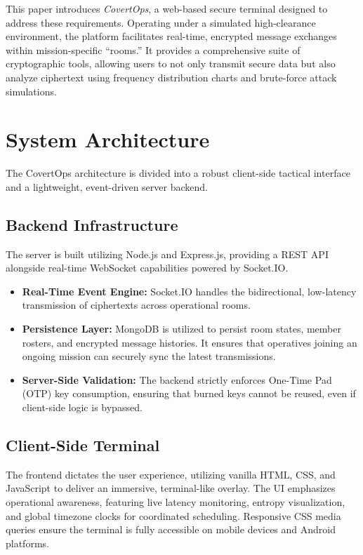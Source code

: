 \documentclass[conference]{IEEEtran}
\begin{document}
This paper introduces \textit{CovertOps}, a web-based secure terminal designed to address these requirements. Operating under a simulated high-clearance environment, the platform facilitates real-time, encrypted message exchanges within mission-specific ``rooms.'' It provides a comprehensive suite of cryptographic tools, allowing users to not only transmit secure data but also analyze ciphertext using frequency distribution charts and brute-force attack simulations.

\section{System Architecture}

The CovertOps architecture is divided into a robust client-side tactical interface and a lightweight, event-driven server backend.

\subsection{Backend Infrastructure}
The server is built utilizing Node.js and Express.js, providing a REST API alongside real-time WebSocket capabilities powered by Socket.IO. 
\begin{itemize}
    \item \textbf{Real-Time Event Engine:} Socket.IO handles the bidirectional, low-latency transmission of ciphertexts across operational rooms.
    \item \textbf{Persistence Layer:} MongoDB is utilized to persist room states, member rosters, and encrypted message histories. It ensures that operatives joining an ongoing mission can securely sync the latest transmissions.
    \item \textbf{Server-Side Validation:} The backend strictly enforces One-Time Pad (OTP) key consumption, ensuring that burned keys cannot be reused, even if client-side logic is bypassed.
\end{itemize}

\subsection{Client-Side Terminal}
The frontend dictates the user experience, utilizing vanilla HTML, CSS, and JavaScript to deliver an immersive, terminal-like overlay. The UI emphasizes operational awareness, featuring live latency monitoring, entropy visualization, and global timezone clocks for coordinated scheduling. Responsive CSS media queries ensure the terminal is fully accessible on mobile devices and Android platforms.
\end{document}
